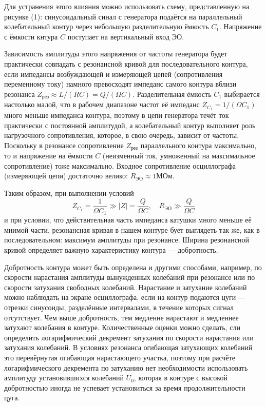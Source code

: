 \documentclass[a4paper, 12pt]{article}%
\begin{document}
	Для устранения этого влияния можно использовать схему, представленную на рисунке (1): синусоидальный синал с генератора подаётся на параллельный колебательный контур через небольшую разделительную ёмкость $C_1$. Напряжение с ёмкости кнтура $C$ поступает на вертикальный вход ЭО.
	
	Зависимость амплитуды этого напряжения от частоты генератора будет практически совпадать с резонансной кривой для последовательного контура, если импедансы возбуждающей и измеряющей цепей (сопротивления переменному току) намного превосходят импеданс самого контура вблизи резонанса $Z_\text{рез} \approx L / (RC) = Q / (\Omega C)$. Разделительная ёмкость $C_1$ выбирается настолько малой, что в рабочем диапазоне частот её импеданс $Z_{C_1} = 1/(\Omega C_1)$ много меньше импеданса контура, поэтому в цепи генератора течёт ток практически с постоянной амплитудой, а колебательный контур выполняет роль нагрузочного сопротивления, которое, в свою очередь, зависит от частоты. Поскольку в резонансе сопротивление $Z_\text{рез}$ параллельного контура максимально, то и напряжение на ёмкости $C$ (неизменный ток, умноженный на максимальное сопротивление) тоже максимально. Входное сопротивление осциллографа (измеряющей цепи) достаточно велико: $R_\text{ЭО} \approx 1 \text{МОм}$.
	
	Таким образом, при выполнении условий
	\[
		Z_{C_1} = \frac{1}{\Omega C_1} \gg |Z| = \frac{Q}{\Omega C}, \quad R_\text{ЭО} \gg \frac{Q}{\Omega C}
	\]
	и при условии, что действительная часть импеданса катушки много меньше её мнимой части, резонансная кривая в нашем контуре бует выглядеть так же, как в последовательном: максимум амплитуды при резонансе. Ширина резонансной кривой определяет важную характеристику контура --- добротность.
	
	Добротность контура может быть определена и другими способами, например, по скорости нарастания амплитуды вынужденных колебаний при резонансе или по скорости затухания свободных колебаний. Нарастание и затухание колебаний можно наблюдать на экране осциллографа, если на контур подаются цуги --- отрезки синусоиды, разделённые интервалами, в течение которых сигнал отсутствует. Чем выше добротность, тем медленне нарастают и медленнее затухают колебания в контуре. Количественные оценки можно сделать, сли определить логарифмический декремент затухания по скорости нарастания или затухания колебаний. В условиях резонанса огибающая затухающих колебаний это перевёрнутая огибающая нарастающего участка, поэтому при расчёте логарифмического декремента по затуханию нет необходимости использовать амплитуду установившихся колебаний $U_0$, которая в контуре с высокой добротностью иногда не успевает установиться за время продолжительности цуга.
	
\end{document}
